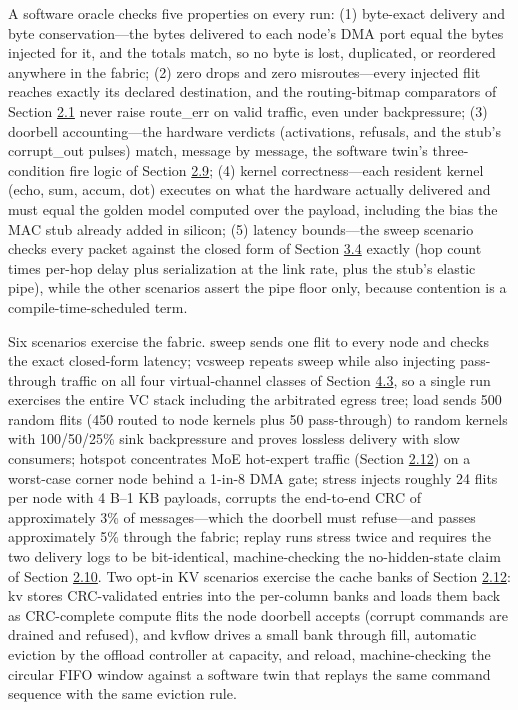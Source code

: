 \documentclass[10pt,twocolumn]{article}
\begin{document}
A software oracle checks five properties on every run: (1) byte-exact delivery and byte conservation---the bytes delivered to each node's DMA port equal the bytes injected for it, and the totals match, so no byte is lost, duplicated, or reordered anywhere in the fabric; (2) zero drops and zero misroutes---every injected flit reaches exactly its declared destination, and the routing-bitmap comparators of Section \hyperref[sec:2.1]{2.1} never raise route\_err on valid traffic, even under backpressure; (3) doorbell accounting---the hardware verdicts (activations, refusals, and the stub's corrupt\_out pulses) match, message by message, the software twin's three-condition fire logic of Section \hyperref[sec:2.9]{2.9}; (4) kernel correctness---each resident kernel (echo, sum, accum, dot) executes on what the hardware actually delivered and must equal the golden model computed over the payload, including the bias the MAC stub already added in silicon; (5) latency bounds---the sweep scenario checks every packet against the closed form of Section \hyperref[sec:3.4]{3.4} exactly (hop count times per-hop delay plus serialization at the link rate, plus the stub's elastic pipe), while the other scenarios assert the pipe floor only, because contention is a compile-time-scheduled term.

Six scenarios exercise the fabric. sweep sends one flit to every node and checks the exact closed-form latency; vcsweep repeats sweep while also injecting pass-through traffic on all four virtual-channel classes of Section \hyperref[sec:4.3]{4.3}, so a single run exercises the entire VC stack including the arbitrated egress tree; load sends 500 random flits (450 routed to node kernels plus 50 pass-through) to random kernels with 100/50/25\% sink backpressure and proves lossless delivery with slow consumers; hotspot concentrates MoE hot-expert traffic (Section \hyperref[sec:2.12]{2.12}) on a worst-case corner node behind a 1-in-8 DMA gate; stress injects roughly 24 flits per node with 4 B--1 KB payloads, corrupts the end-to-end CRC of approximately 3\% of messages---which the doorbell must refuse---and passes approximately 5\% through the fabric; replay runs stress twice and requires the two delivery logs to be bit-identical, machine-checking the no-hidden-state claim of Section \hyperref[sec:2.10]{2.10}. Two opt-in KV scenarios exercise the cache banks of Section \hyperref[sec:2.12]{2.12}: kv stores CRC-validated entries into the per-column banks and loads them back as CRC-complete compute flits the node doorbell accepts (corrupt commands are drained and refused), and kvflow drives a small bank through fill, automatic eviction by the offload controller at capacity, and reload, machine-checking the circular FIFO window against a software twin that replays the same command sequence with the same eviction rule.
\end{document}
